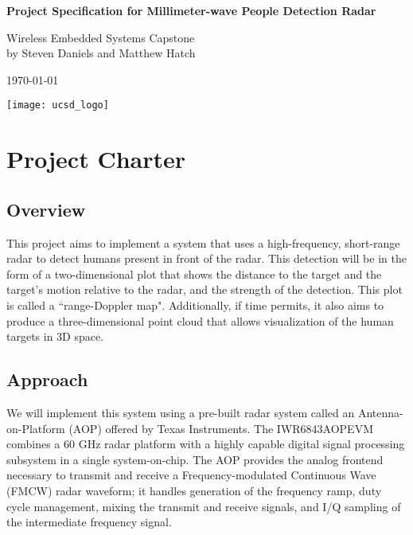 \documentclass[12pt, oneside, titlepage, final]{article}
\begin{document}
	\hypersetup{pageanchor=false}

	\begin{titlepage}
		\centering

		\vspace*{3cm}

		\Huge
		\textbf{Project Specification for Millimeter-wave People Detection Radar}

		\vspace{0.5cm}

		\large
		Wireless Embedded Systems Capstone\\
		by Steven Daniels and Matthew Hatch

		\today

		\vspace{3cm}

		\texttt{[image: ucsd\_logo]}

	\end{titlepage}


	\tableofcontents

	\newpage

	\hypersetup{pageanchor=true}


	\section{Project Charter}

	\subsection{Overview}

	This project aims to implement a system that uses a high-frequency, short-range radar to detect humans
	present in front of the radar. This detection will be in the form of a two-dimensional plot that shows
	the distance to the target and the target's motion relative to the radar, and the strength of the
	detection. This plot is called a “range-Doppler map". Additionally, if time permits, it also aims to
	produce a three-dimensional point cloud that allows visualization of the human targets in 3D space.

	\subsection{Approach}

	We will implement this system using a pre-built radar system called an Antenna-on-Platform (AOP)
	offered by Texas Instruments. The IWR6843AOPEVM combines a 60 GHz radar platform with a highly capable
	digital signal processing subsystem in a single system-on-chip. The AOP provides the analog frontend
	necessary to transmit and receive a Frequency-modulated Continuous Wave (FMCW) radar waveform; it
	handles generation of the frequency ramp, duty cycle management, mixing the transmit and receive
	signals, and I/Q sampling of the intermediate frequency signal.
\end{document}
